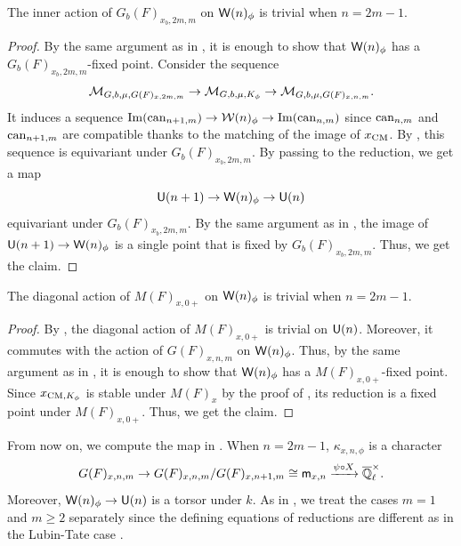 \documentclass[12pt,reqno]{amsart}
\begin{document}
\begin{prop} \label{prop:trivial_inner_action_odd}
    The inner action of $G_b(F)_{x_b, 2m, m}$ on ${\mathsf{W}}(n)_\phi$ is trivial when $n = 2m - 1$. 
\end{prop}
\begin{proof}
    By the same argument as in , it is enough to show that ${\mathsf{W}}(n)_\phi$ has a $G_b(F)_{x_b, 2m, m}$-fixed point. Consider the sequence 
    \[
        {\mathcal{M}}_{G, b, \mu, G(F)_{x, 2m, m}} \to {\mathcal{M}}_{G, b, \mu, K_\phi} \to {\mathcal{M}}_{G, b, \mu, G(F)_{x, n, m}}. 
    \]
    It induces a sequence ${\operatorname{Im}}({\operatorname{can}}_{n + 1, m}) \to {\mathcal{W}}(n)_\phi \to {\operatorname{Im}}({\operatorname{can}}_{n, m})$ since ${\operatorname{can}}_{n, m}$ and ${\operatorname{can}}_{n + 1, m}$ are compatible thanks to the matching of the image of $x_{\operatorname{CM}}$. By , this sequence is equivariant under $G_b(F)_{x_b, 2m, m}$. By passing to the reduction, we get a map 
    \[
        {\mathsf{U}}(n + 1) \to {\mathsf{W}}(n)_\phi \to {\mathsf{U}}(n)
    \]
    equivariant under $G_b(F)_{x_b, 2m, m}$. By the same argument as in , the image of ${\mathsf{U}}(n + 1) \to {\mathsf{W}}(n)_\phi$ is a single point that is fixed by $G_b(F)_{x_b, 2m, m}$. Thus, we get the claim. 
\end{proof}

\begin{prop} \label{prop:positive_depth_diagonal_action_odd}
    The diagonal action of $M(F)_{x, 0+}$ on ${\mathsf{W}}(n)_\phi$ is trivial when $n = 2m - 1$. 
\end{prop}
\begin{proof}
    By , the diagonal action of $M(F)_{x, 0+}$ is trivial on ${\mathsf{U}}(n)$. Moreover, it commutes with the action of $G(F)_{x, n, m}$ on ${\mathsf{W}}(n)_\phi$. Thus, by the same argument as in , it is enough to show that ${\mathsf{W}}(n)_\phi$ has a $M(F)_{x, 0+}$-fixed point. Since $x_{{\operatorname{CM}}, K_\phi}$ is stable under $M(F)_{x}$ by the proof of , its reduction is a fixed point under $M(F)_{x, 0+}$. Thus, we get the claim. 
\end{proof}

From now on, we compute the map in . When $n = 2m - 1$, $\kappa_{x, n, \phi}$ is a character 
\[
    G(F)_{x, n, m} \to G(F)_{x, n, m} / G(F)_{x, n+1, m} \cong {\mathsf{m}}_{x, n} \xrightarrow{\psi \circ X} {\overline{\mathbb{Q}}_\ell^\times}. 
\] 
Moreover, ${\mathsf{W}}(n)_\phi \to {\mathsf{U}}(n)$ is a torsor under $k$. As in , we treat the cases $m = 1$ and $m \geq 2$ separately since the defining equations of reductions are different as in the Lubin-Tate case \cite[Section 3.9]{BW16}.
\end{document}
